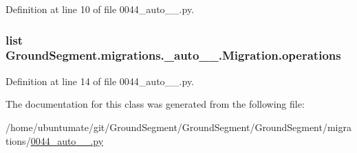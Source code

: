 Definition at line 10 of file 0044\+\_\+auto\+\_\+\_.\+py.

\hypertarget{class_ground_segment_1_1migrations_1_10044__auto__20170206__1250_1_1_migration_aafba09623f56b7b093accbe617ca31bb}{}
\subsubsection[{operations}]{\setlength{\rightskip}{0pt plus 5cm}list Ground\+Segment.\+migrations.\+\_\+auto\+\_\+\_.\+Migration.\+operations\hspace{0.3cm}{\ttfamily [static]}}\label{class_ground_segment_1_1migrations_1_10044__auto__20170206__1250_1_1_migration_aafba09623f56b7b093accbe617ca31bb}


Definition at line 14 of file 0044\+\_\+auto\+\_\+\_.\+py.



The documentation for this class was generated from the following file\+:\begin{DoxyCompactItemize}
\item 
/home/ubuntumate/git/\+Ground\+Segment/\+Ground\+Segment/\+Ground\+Segment/migrations/\hyperlink{0044__auto__20170206__1250_8py}{0044\+\_\+auto\+\_\+\_.\+py}\end{DoxyCompactItemize}
